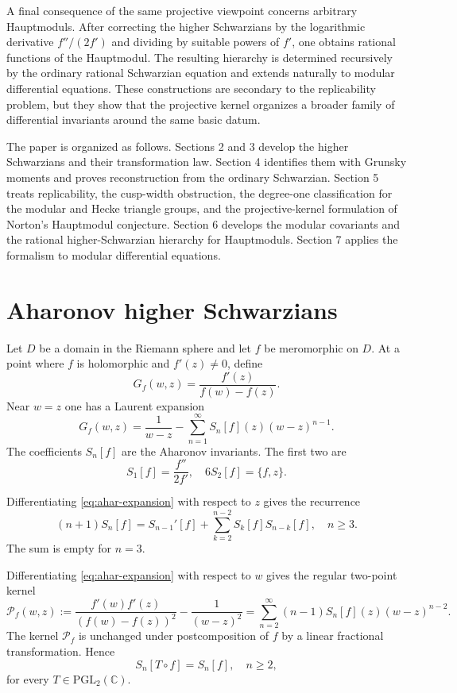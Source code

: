 \documentclass[11pt]{amsart}
\theoremstyle{definition}
\theoremstyle{remark}
\numberwithin{equation}{section}
\begin{document}
A final consequence of the same projective viewpoint concerns arbitrary Hauptmoduls. After correcting the higher Schwarzians by the logarithmic derivative $f''/(2f')$ and dividing by suitable powers of $f'$, one obtains rational functions of the Hauptmodul. The resulting hierarchy is determined recursively by the ordinary rational Schwarzian equation and extends naturally to modular differential equations. These constructions are secondary to the replicability problem, but they show that the projective kernel organizes a broader family of differential invariants around the same basic datum.

The paper is organized as follows. Sections 2 and 3 develop the higher Schwarzians and their transformation law. Section 4 identifies them with Grunsky moments and proves reconstruction from the ordinary Schwarzian. Section 5 treats replicability, the cusp-width obstruction, the degree-one classification for the modular and Hecke triangle groups, and the projective-kernel formulation of Norton's Hauptmodul conjecture. Section 6 develops the modular covariants and the rational higher-Schwarzian hierarchy for Hauptmoduls. Section 7 applies the formalism to modular differential equations.

\section{Aharonov higher Schwarzians}

Let $D$ be a domain in the Riemann sphere and let $f$ be meromorphic on $D$. At a point where $f$ is holomorphic and $f'(z)\neq0$, define
\[
G_f(w,z)=\frac{f'(z)}{f(w)-f(z)}.
\]
Near $w=z$ one has a Laurent expansion
\begin{equation}\label{eq:ahar-expansion}
G_f(w,z)
=
\frac1{w-z}-\sum_{n=1}^{\infty}S_n[f](z)(w-z)^{n-1}.
\end{equation}
The coefficients $S_n[f]$ are the Aharonov invariants. The first two are
\begin{equation*}
S_1[f]=\frac{f''}{2f'},
\quad
6S_2[f]=\{f,z\}.
\end{equation*}

Differentiating \eqref{eq:ahar-expansion} with respect to $z$ gives the recurrence
\begin{equation}\label{eq:ahar-recurrence}
(n+1)S_n[f]
=
S_{n-1}'[f]
+
\sum_{k=2}^{n-2}S_k[f]S_{n-k}[f],
\quad n\geq3.
\end{equation}
The sum is empty for $n=3$.

Differentiating \eqref{eq:ahar-expansion} with respect to $w$ gives the regular two-point kernel
\begin{equation}\label{eq:local-projective-kernel}
\mathcal P_f(w,z)
:=
\frac{f'(w)f'(z)}{(f(w)-f(z))^2}-\frac1{(w-z)^2}
=
\sum_{n=2}^{\infty}(n-1)S_n[f](z)(w-z)^{n-2}.
\end{equation}
The kernel $\mathcal P_f$ is unchanged under postcomposition of $f$ by a linear fractional transformation. Hence
\begin{equation}\label{eq:projective-invariance}
S_n[T\circ f]=S_n[f],\quad n\geq2,
\end{equation}
for every $T\in\mathrm{PGL}_2(\mathbb C)$.
\end{document}
